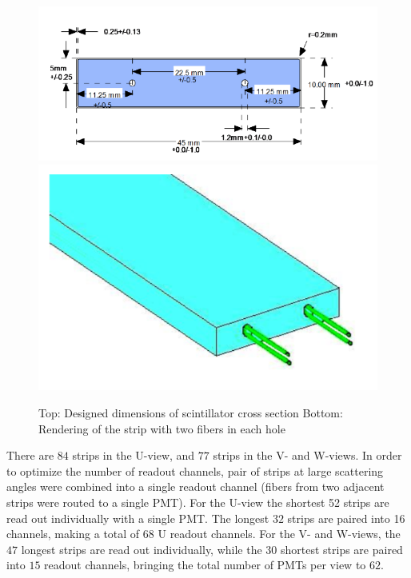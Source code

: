 \begin{figure}[hbt]
\centering
\includegraphics[width=1.05\columnwidth,keepaspectratio]{img/S3_4a.png}
\includegraphics[width=0.75\columnwidth,keepaspectratio]{img/S3_4b.png}
\caption[PCAL UVW Layers]{Top: Designed dimensions of scintillator cross section Bottom: Rendering of the strip with two fibers in each hole}
\label{fig:S3_4}
\end{figure}

There are $84$ strips in the U-view, and $77$ strips in the V- and W-views. In order to optimize the number of readout channels, pair of strips at large scattering angles were combined into a single readout channel (fibers from two adjacent strips were routed to a single PMT). For the U-view the shortest 52 strips are read out individually with a single PMT. The longest $32$ strips are paired into 16 channels, making a total of $68$ U readout channels.  For the V- and W-views, the $47$ longest strips are read out individually, while the $30$ shortest strips are paired into $15$ readout channels, bringing the total number of PMTs per view to $62$. 


